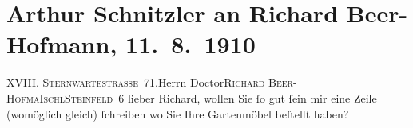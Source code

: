 

         
         \renewcommand{\erwaehntePersonen}{Personen: Richard Beer-Hofmann}
         \renewcommand{\erwaehnteOrte}{Orte: Bad Ischl, Steinfeld, Sternwartestraße, Wien, XVIII., Währing}
         \renewcommand{\erwaehnteWerke}{}
               \section[Arthur Schnitzler an Richard Beer-Hofmann, 11. 8. 1910]{ Arthur Schnitzler an Richard Beer-Hofmann, 11. 8. 1910}\nopagebreak{}\rehead{ }\begin{ledgroupsized}[t]{13cm}\normalsize\beginnumbering{} \toendnotes[C]{\smallbreak\pagebreak[2]} 
\toendnotes[C]{\smallbreak}\pstart{}{\pb}\textsc{XVIII. Sternwartestraße 71.}\pend{}{\bigskip}\pstart{}Herrn Doctor\pend{}\pstart{}\textsc{Richard Beer-Hofma{\geminationn}}\pend{}\pstart{}\textsc{Ischl}\pend{}\pstart{}\textsc{Steinfeld 6}\pend{}{\bigskip}\pstart
           \noindent{}{\pb}lieber Richard, wollen Sie ſo gut ſein mir eine Zeile (womöglich
               gleich) ſchreiben wo Sie Ihre Gartenmöbel beſtellt haben?\pend
           \pstart \label{T_L01953-1v}\label{T_L01953-1h}\pend{}
         
         \endnumbering{}\end{ledgroupsized}  \newcommand{\dateiname}{L01953}\newcommand{\titel}{Arthur Schnitzler an Richard Beer-Hofmann, 11. 8. 1910}\newcommand{\editorInnen}{Martin Anton Müller und Gerd-Hermann Susen}
      